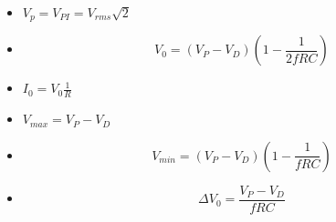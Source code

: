 \documentclass[12pt]{article}
\begin{document}
            \begin{multicols}{2}
                \begin{itemize}
                    \item$V_p = V_{PI} = V_{rms}\sqrt{2}$
                    \item \begin{equation*}
                        V_0=(V_P-V_D)(1-\frac{1}{2fRC})
                    \end{equation*}
                    \item $I_0 = V_0 \frac{1}{R}$
                    \item $V_{max} = V_P - V_D$
                    \item \begin{equation*}
                        V_{min}=(V_P-V_D)(1-\frac{1}{fRC})
                    \end{equation*}
                    \item \begin{equation*}
                        \Delta  V_0 = \frac{V_P-V_D}{fRC}
                    \end{equation*}
                \end{itemize}
            \end{multicols}
\end{document}

